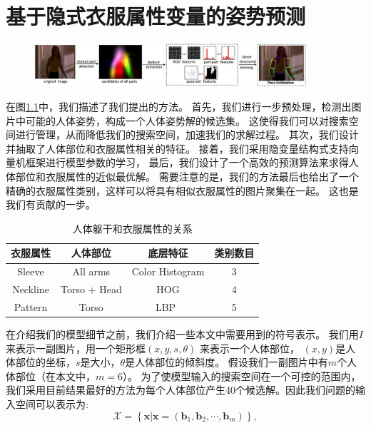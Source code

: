 
\chapter{基于隐式衣服属性变量的姿势预测}
\label{chap:model}

\begin{figure}[tbp]
\centering
\includegraphics[width=0.9\textwidth]{img/frame.jpg}
\label{fig:frame}
\end{figure}

在图\ref{fig:frame}中，我们描述了我们提出的方法。
首先，我们进行一步预处理，检测出图片中可能的人体姿势，构成一个人体姿势解的候选集。
这使得我们可以对搜索空间进行管理，从而降低我们的搜索空间，加速我们的求解过程。
其次，我们设计并抽取了人体部位和衣服属性相关的特征。
接着，我们采用隐变量结构式支持向量机框架进行模型参数的学习，
最后，我们设计了一个高效的预测算法来求得人体部位和衣服属性的近似最优解。
需要注意的是，我们的方法最后也给出了一个精确的衣服属性类别，这样可以将具有相似衣服属性的图片聚集在一起。
这也是我们有贡献的一步。


\begin{table}
\label{tb:attr}
\centering
\caption{人体躯干和衣服属性的关系}
\begin{tabular}{|c|c|c|c|} \hline
衣服属性& 人体部位& 底层特征& 类别数目\\ \hline
Sleeve &  All arms & Color Histogram & 3 \\ \hline
Neckline & Torso + Head & HOG & 4\\ \hline
 Pattern & Torso & LBP~\cite{lbp} & 5\\ \hline
\end{tabular}
\end{table}

在介绍我们的模型细节之前，我们介绍一些本文中需要用到的符号表示。
我们用$I$来表示一副图片，用一个矩形框$(x, y, s, \theta)$ 来表示一个人体部位，
$(x, y)$是人体部位的坐标，$s$是大小，$\theta$是人体部位的倾斜度。
假设我们一副图片中有$m$个人体部位（在本文中，$m = 6$）。
为了使模型输入的搜索空间在一个可控的范围内，我们采用目前结果最好的方法为每个人体部位产生40个候选解。因此我们问题的输入空间可以表示为:
\begin{equation}
    \mathcal{X} = \left\{ \mathbf{x}|\mathbf{x} = ( \mathbf{b}_1, \mathbf{b}_2, \cdots, \mathbf{b}_m ) \right\},
\end{equation}

